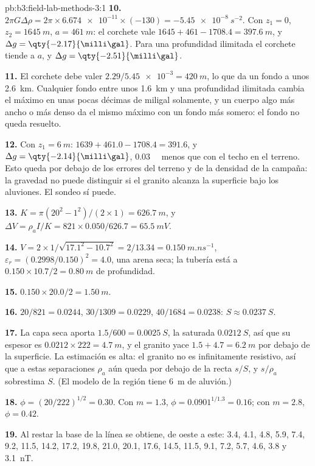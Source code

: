 \begin{solution}{pb:b3:field-lab-methods-3:1}
\textbf{10.} $2\pi G\Delta\rho = 2\pi\times\num{6.674e-11}\times(-130) =
\qty{-5.45e-8}{s^{-2}}$. Con $z_1 = 0$, $z_2 = \qty{1645}{m}$, $a =
\qty{461}{m}$: el corchete vale $1645 + 461 - 1708.4 = \qty{397.6}{m}$,
y $\Delta g = \qty{-2.17}{\milli\gal}$. Para una profundidad ilimitada el corchete
tiende a $a$, y $\Delta g = \qty{-2.51}{\milli\gal}$.

\textbf{11.} El corchete debe valer $2.29/\num{5.45e-3} = \qty{420}{m}$, lo que
da un fondo a unos \qty{2.6}{km}. Cualquier fondo entre unos
\qty{1.6}{km} y una profundidad ilimitada cambia el máximo en unas pocas décimas
de miligal solamente, y un cuerpo algo más ancho o más denso da el mismo
máximo con un fondo más somero: el fondo no queda resuelto.

\textbf{12.} Con $z_1 = \qty{6}{m}$: $1639 + 461.0 - 1708.4 = 391.6$, y
$\Delta g = \qty{-2.14}{\milli\gal}$, \qty{0.03}{\milli\gal} menos que
con el techo en el terreno. Esto queda por debajo de los errores del terreno y de la densidad
de la campaña: la gravedad no puede distinguir si el granito alcanza
la superficie bajo los aluviones. El sondeo sí puede.

\textbf{13.} $K = \pi(20^2 - 1^2)/(2\times1) = \qty{626.7}{m}$, y $\Delta V =
\rho_a I/K = 821\times0.050/626.7 = \qty{65.5}{mV}$.

\textbf{14.} $V = 2\times1/\sqrt{17.1^2 - 10.7^2} = 2/13.34 =
\qty{0.150}{m.ns^{-1}}$, $\varepsilon_r = (0.2998/0.150)^2 = 4.0$, una
arena seca; la tubería está a $0.150\times10.7/2 = \qty{0.80}{m}$ de profundidad.

\textbf{15.} $0.150\times20.0/2 = \qty{1.50}{m}$.

\textbf{16.} $20/821 = \num{0.0244}$, $30/1309 = \num{0.0229}$, $40/1684 =
\num{0.0238}$: $S \approx \qty{0.0237}{S}$.

\textbf{17.} La capa seca aporta $1.5/600 = \qty{0.0025}{S}$, la
saturada $\qty{0.0212}{S}$, así que su espesor es $0.0212\times222 =
\qty{4.7}{m}$, y el granito yace $1.5 + 4.7 = \qty{6.2}{m}$ por debajo de
la superficie. La estimación es alta: el granito no es infinitamente
resistivo, así que a estas separaciones $\rho_a$ aún queda por debajo de la recta
$s/S$, y $s/\rho_a$ sobrestima $S$. (El modelo de la región tiene
\qty{6}{m} de aluvión.)

\textbf{18.} $\phi = (20/222)^{1/2} = \num{0.30}$. Con $m = 1.3$, $\phi =
0.0901^{1/1.3} = \num{0.16}$; con $m = 2.8$, $\phi = \num{0.42}$.

\textbf{19.} Al restar la base de la línea se obtiene, de oeste a este:
3.4, 4.1, 4.8, 5.9, 7.4, 9.2, 11.5, 14.2, 17.2, 19.8, 21.0, 20.1, 17.6,
14.5, 11.5, 9.1, 7.2, 5.7, 4.6, 3.8 y \qty{3.1}{nT}.


\end{solution}
